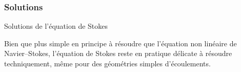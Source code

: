 \subsubsection{Solutions}
\begin{frame}{Solutions de l'équation de Stokes}

\small

Bien que plus simple en principe à résoudre que l'équation non linéaire de Navier--Stokes,
l'équation de Stokes reste en pratique délicate à résoudre techniquement, 
même pour des géométries simples d'écoulements. 


\vspace{50mm}

\end{frame}

